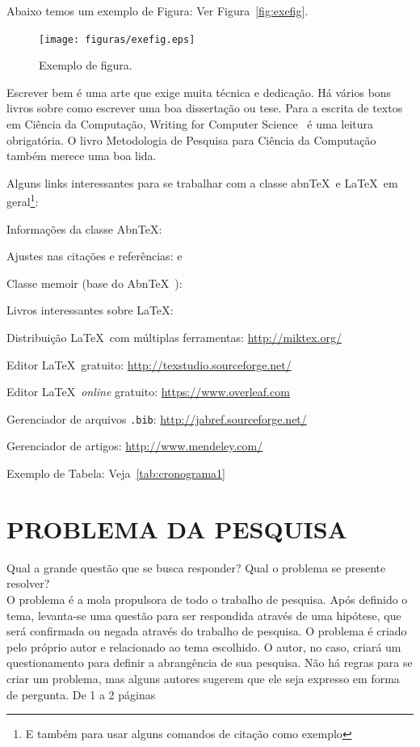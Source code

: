 \documentclass[
    12pt,				       %
    openright,			       %
    oneside,			       %
    a4paper,			       %
    chapter=TITLE,             %
    sumario=tradicional,       %
    english,			        %
    brazil, 				    %
 ]{abntex2}
\begin{document}
Abaixo temos um exemplo de Figura: Ver Figura~\autoref{fig:exefig}.

\begin{figure}[!ht]
    \centering
    \caption{Exemplo de figura.}
    \texttt{[image: figuras/exefig.eps]}
    \label{fig:exefig}
\end{figure}

Escrever bem é uma arte que exige muita técnica e dedicação. Há vários bons livros sobre como escrever uma boa dissertação ou tese. Para a escrita de textos em Ciência da Computação, Writing for Computer Science~\cite{zobel2014} é uma leitura obrigatória. O livro Metodologia de Pesquisa para Ciência da Computação~\cite{wazlawick2009} também merece uma boa lida.

Alguns links interessantes para se trabalhar com a classe abn\TeX\ e \LaTeX\ em geral\footnote{E também para usar alguns comandos de citação como exemplo}:
\begin{alineas}
    \item Informações da classe Abn\TeX: 
    \item Ajustes nas citações e referências:  e 
    \item Classe memoir (base do Abn\TeX\ ): 
    \item Livros interessantes sobre \LaTeX: \cite{Dongen2012,LeslieLamport90,FrankMittelbach111,Dongen2012}
    \item Distribuição \LaTeX\ com múltiplas ferramentas: \url{http://miktex.org/}
    \item Editor \LaTeX\ gratuito: \url{http://texstudio.sourceforge.net/}
    \item Editor \LaTeX\ \textit{online} gratuito: \url{https://www.overleaf.com}
    \item Gerenciador de arquivos \texttt{.bib}: \url{http://jabref.sourceforge.net/}
    \item Gerenciador de artigos: \url{http://www.mendeley.com/}
    \item Exemplo de Tabela: Veja~\autoref{tab:cronograma1}
\end{alineas}

\section{\MakeUppercase{Problema da Pesquisa}}\label{sec:ProbPesq}
Qual a grande questão que se busca responder? Qual o problema se presente resolver? \\
O problema é a mola propulsora de todo o trabalho de pesquisa. Após definido o tema, levanta-se uma questão para ser respondida através de uma hipótese, que será confirmada ou negada através do trabalho de pesquisa. O problema é criado pelo próprio autor e relacionado ao tema escolhido. O autor, no caso, criará um questionamento para definir a abrangência de sua pesquisa. Não há regras para se criar um problema, mas alguns autores sugerem que ele seja expresso em forma de pergunta.
De 1 a 2 páginas
\end{document}
